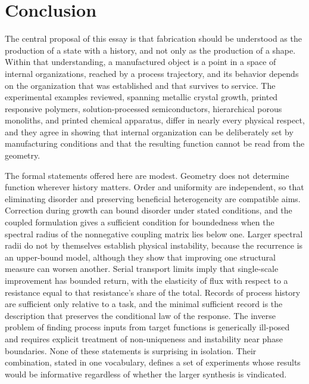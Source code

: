 \documentclass[11pt]{article}
\theoremstyle{definition}
\begin{document}
\section{Conclusion}

The central proposal of this essay is that fabrication should be understood as the production of a state with a history, and not only as the production of a shape. Within that understanding, a manufactured object is a point in a space of internal organizations, reached by a process trajectory, and its behavior depends on the organization that was established and that survives to service. The experimental examples reviewed, spanning metallic crystal growth, printed responsive polymers, solution-processed semiconductors, hierarchical porous monoliths, and printed chemical apparatus, differ in nearly every physical respect, and they agree in showing that internal organization can be deliberately set by manufacturing conditions and that the resulting function cannot be read from the geometry.

The formal statements offered here are modest. Geometry does not determine function wherever history matters. Order and uniformity are independent, so that eliminating disorder and preserving beneficial heterogeneity are compatible aims. Correction during growth can bound disorder under stated conditions, and the coupled formulation gives a sufficient condition for boundedness when the spectral radius of the nonnegative coupling matrix lies below one. Larger spectral radii do not by themselves establish physical instability, because the recurrence is an upper-bound model, although they show that improving one structural measure can worsen another. Serial transport limits imply that single-scale improvement has bounded return, with the elasticity of flux with respect to a resistance equal to that resistance's share of the total. Records of process history are sufficient only relative to a task, and the minimal sufficient record is the description that preserves the conditional law of the response. The inverse problem of finding process inputs from target functions is generically ill-posed and requires explicit treatment of non-uniqueness and instability near phase boundaries. None of these statements is surprising in isolation. Their combination, stated in one vocabulary, defines a set of experiments whose results would be informative regardless of whether the larger synthesis is vindicated.
\end{document}
